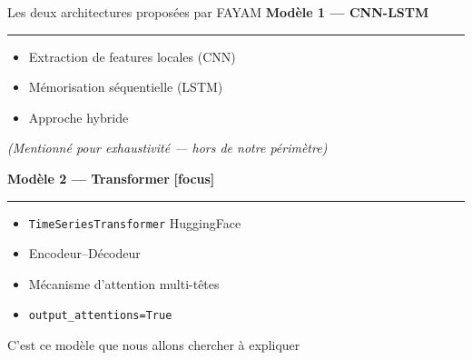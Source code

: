 \documentclass[10pt]{beamer}
\begin{document}
\begin{frame}{Les deux architectures proposées par FAYAM}
	\textbf{Modèle 1 --- CNN-LSTM}
	\rule{\linewidth}{0.5pt}
	\vspace{2pt}
	
	\begin{itemize}
		\item Extraction de features locales (CNN)
		\item Mémorisation séquentielle (LSTM)
		\item Approche hybride
	\end{itemize}
	
	{\small \textit{(Mentionné pour exhaustivité --- hors de notre périmètre)}}
	
	\vspace{6pt}
	
	\textbf{Modèle 2 --- Transformer} \textcolor{blue!70!black}{\textbf{[focus]}}
	\rule{\linewidth}{0.5pt}
	\vspace{2pt}
	
	\begin{itemize}
		\item \texttt{TimeSeriesTransformer} HuggingFace
		\item Encodeur--Décodeur
		\item Mécanisme d'attention multi-têtes
		\item \texttt{output\_attentions=True}
	\end{itemize}
	
	{\small \textcolor{blue!70!black}{C'est ce modèle que nous allons chercher à expliquer}}
\end{frame}
\end{document}
